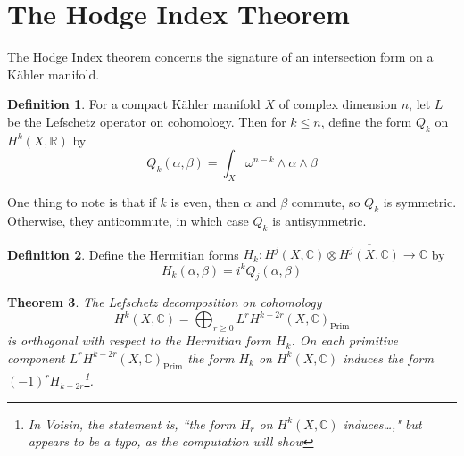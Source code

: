 \documentclass[psamsfonts, 12pt]{amsart}
\newtheorem{thm}{Theorem}[section]
\theoremstyle{definition}
\newtheorem{defn}[thm]{Definition}
\theoremstyle{remark}
\newcommand{\R}{\mathbb{R}}
\newcommand{\C}{\mathbb{C}}
\begin{document}
\section{The Hodge Index Theorem}
%
The Hodge Index theorem concerns the signature of an intersection form on a
K\"ahler manifold.
%
\begin{defn}
For a compact K\"ahler manifold $X$ of complex dimension $n$, let $L$ be the Lefschetz
operator on cohomology. Then for $k \leq n$, define the form $Q_k$ on $H^k(X,\R)$ by
\[
Q_k(\alpha,\beta) = \int_X \omega^{n-k}\wedge\alpha\wedge\beta
\]
\end{defn}
%
One thing to note is that if $k$ is even, then $\alpha$ and $\beta$ commute, so
$Q_k$ is symmetric. Otherwise, they anticommute, in which case $Q_k$ is antisymmetric.
%
\begin{defn}
Define the Hermitian forms $H_k : H^j(X,\C) \otimes \overline{H^j(X,\C)} \to \C$ by
\[
H_k(\alpha,\beta) = i^kQ_j(\alpha,\beta)
\]
\end{defn}
%
\begin{thm}
The Lefschetz decomposition on cohomology
\[
H^k(X,\C) = \bigoplus_{r\geq 0} L^r H^{k-2r}(X,\C)_{\mathrm{Prim}}
\]
is orthogonal with respect to the Hermitian form $H_k$. On each primitive component
$L^rH^{k-2r}(X,\C)_{\mathrm{Prim}}$ the form $H_k$ on $H^k(X,\C)$ induces the form
$(-1)^rH_{k-2r}$\footnote{In Voisin, the statement is, ``the form $H_r$ on $H^k(X,\C)$
induces\ldots," but appears to be a typo, as the computation will show}.
\end{thm}
%
\end{document}

